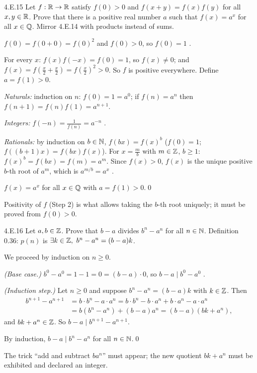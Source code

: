 \begin{bookex}[recommended]{4.E.15}
Let $f:\mathbb{R}\to\mathbb{R}$ satisfy $f(0)>0$ and $f(x+y)=f(x)f(y)$ for all $x,y\in\mathbb{R}$. Prove that there is a positive real number $a$ such that $f(x)=a^x$ for all $x\in\mathbb{Q}$.
\solution
\plan Mirror 4.E.14 with products instead of sums.
\begin{steps}
\item $f(0)=f(0+0)=f(0)^2$ and $f(0)>0$, so $f(0)=1$ .
\item For every $x$: $f(x)f(-x)=f(0)=1$, so $f(x)\ne0$; and $f(x)=f(\frac x2+\frac x2)=f(\frac x2)^2>0$. So $f$ is positive everywhere. Define $a=f(1)>0$.
\item \emph{Naturals:} induction on $n$: $f(0)=1=a^0$; if $f(n)=a^n$ then $f(n+1)=f(n)f(1)=a^{n+1}$.
\item \emph{Integers:} $f(-n)=\frac1{f(n)}=a^{-n}$ .
\item \emph{Rationals:} by induction on $b\in\mathbb{N}$, $f(bx)=f(x)^b$ ($f(0)=1$; $f((b+1)x)=f(bx)f(x)$). For $x=\frac mb$ with $m\in\mathbb{Z}$, $b\ge1$: $f(x)^b=f(bx)=f(m)=a^m$. Since $f(x)>0$, $f(x)$ is the unique positive $b$-th root of $a^m$, which is $a^{m/b}=a^x$ .
\end{steps}
\conclusion $f(x)=a^x$ for all $x\in\mathbb{Q}$ with $a=f(1)>0$.\qed
\begin{compare}
\item Positivity of $f$ (Step 2) is what allows taking the $b$-th root uniquely; it must be proved from $f(0)>0$.
\end{compare}
\end{bookex}

\begin{bookex}[essential]{4.E.16}
Let $a,b\in\mathbb{Z}$. Prove that $b-a$ divides $b^n-a^n$ for all $n\in\mathbb{N}$.
\solution
\given Definition 0.36: $p(n)$ is $\exists k\in\Z,\ b^n-a^n=(b-a)k$.
\begin{steps}
\item We proceed by induction on $n\ge0$.
\item \emph{(Base case.)} $b^0-a^0=1-1=0=(b-a)\cdot0$, so $b-a\mid b^0-a^0$ .
\item \emph{(Induction step.)} Let $n\ge0$ and suppose $b^n-a^n=(b-a)k$ with $k\in\mathbb{Z}$. Then
\begin{align*}
b^{n+1}-a^{n+1}&=b\cdot b^n-a\cdot a^n=b\cdot b^n-b\cdot a^n+b\cdot a^n-a\cdot a^n\\
&=b(b^n-a^n)+(b-a)a^n=(b-a)(bk+a^n),
\end{align*}
 and $bk+a^n\in\mathbb{Z}$. So $b-a\mid b^{n+1}-a^{n+1}$.
\end{steps}
\conclusion By induction, $b-a\mid b^n-a^n$ for all $n\in\mathbb{N}$.\qed
\begin{compare}
\item The trick ``add and subtract $ba^n$'' must appear; the new quotient $bk+a^n$ must be exhibited and declared an integer.
\end{compare}
\end{bookex}

